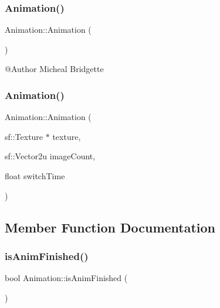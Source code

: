 \subsubsection{\texorpdfstring{Animation()}{Animation()}\hspace{0.1cm}{\footnotesize\ttfamily [1/2]}}
{\footnotesize\ttfamily Animation\+::\+Animation (\begin{DoxyParamCaption}{ }\end{DoxyParamCaption})}



@\+Author Micheal Bridgette 

\mbox{\label{class_animation_a6353d585c4a1aa26cfbc6ee24d314969}} 
\subsubsection{\texorpdfstring{Animation()}{Animation()}\hspace{0.1cm}{\footnotesize\ttfamily [2/2]}}
{\footnotesize\ttfamily Animation\+::\+Animation (\begin{DoxyParamCaption}\item[{sf\+::\+Texture $\ast$}]{texture,  }\item[{sf\+::\+Vector2u}]{image\+Count,  }\item[{float}]{switch\+Time }\end{DoxyParamCaption})}



\subsection{Member Function Documentation}
\mbox{\label{class_animation_aa41a6d43bc5e56f73c07eb5998aba757}} 
\subsubsection{\texorpdfstring{isAnimFinished()}{isAnimFinished()}}
{\footnotesize\ttfamily bool Animation\+::is\+Anim\+Finished (\begin{DoxyParamCaption}{ }\end{DoxyParamCaption})}

\mbox{\label{class_animation_ad9fb857c59f02aaff307eff7be73203a}} 
